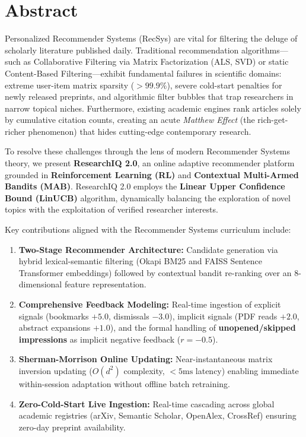 \documentclass[11pt,a4paper]{article}
\begin{document}
\newpage

\section*{\centering Abstract}

Personalized Recommender Systems (RecSys) are vital for filtering the deluge of scholarly literature published daily. Traditional recommendation algorithms---such as Collaborative Filtering via Matrix Factorization (ALS, SVD) or static Content-Based Filtering---exhibit fundamental failures in scientific domains: extreme user-item matrix sparsity ($>99.9\%$), severe cold-start penalties for newly released preprints, and algorithmic filter bubbles that trap researchers in narrow topical niches. Furthermore, existing academic engines rank articles solely by cumulative citation counts, creating an acute \textit{Matthew Effect} (the rich-get-richer phenomenon) that hides cutting-edge contemporary research.

To resolve these challenges through the lens of modern Recommender Systems theory, we present \textbf{ResearchIQ 2.0}, an online adaptive recommender platform grounded in \textbf{Reinforcement Learning (RL)} and \textbf{Contextual Multi-Armed Bandits (MAB)}. ResearchIQ 2.0 employs the \textbf{Linear Upper Confidence Bound (LinUCB)} algorithm, dynamically balancing the exploration of novel topics with the exploitation of verified researcher interests.

Key contributions aligned with the Recommender Systems curriculum include:
\begin{enumerate}[leftmargin=1.5em]
    \item \textbf{Two-Stage Recommender Architecture:} Candidate generation via hybrid lexical-semantic filtering (Okapi BM25 and FAISS Sentence Transformer embeddings) followed by contextual bandit re-ranking over an 8-dimensional feature representation.
    \item \textbf{Comprehensive Feedback Modeling:} Real-time ingestion of explicit signals (bookmarks $+5.0$, dismissals $-3.0$), implicit signals (PDF reads $+2.0$, abstract expansions $+1.0$), and the formal handling of \textbf{unopened/skipped impressions} as implicit negative feedback ($r = -0.5$).
    \item \textbf{Sherman-Morrison Online Updating:} Near-instantaneous matrix inversion updating ($O(d^2)$ complexity, $< 5\text{ms}$ latency) enabling immediate within-session adaptation without offline batch retraining.
    \item \textbf{Zero-Cold-Start Live Ingestion:} Real-time cascading across global academic registries (arXiv, Semantic Scholar, OpenAlex, CrossRef) ensuring zero-day preprint availability.
\end{enumerate}
\end{document}
